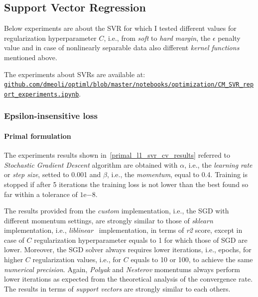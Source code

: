\subsection{Support Vector Regression}

Below experiments are about the SVR for which I tested different values for regularization hyperparameter $C$, i.e., from \emph{soft} to \emph{hard margin}, the $\epsilon$ penalty value and in case of nonlinearly separable data also different \emph{kernel functions} mentioned above.

The experiments about SVRs are available at: \\ \href{https://github.com/dmeoli/optiml/blob/master/notebooks/optimization/CM_SVR_report_experiments.ipynb}{\texttt{github.com/dmeoli/optiml/blob/master/notebooks/optimization/CM\_SVR\_report\_experiments.ipynb}}.

\subsubsection{Epsilon-insensitive loss}

\paragraph{Primal formulation}

The experiments results shown in~\ref{primal_l1_svr_cv_results} referred to \emph{Stochastic Gradient Descent} algorithm are obtained with $\alpha$, i.e., the \emph{learning rate} or \emph{step size}, setted to 0.001 and $\beta$, i.e., the \emph{momentum}, equal to 0.4. Training is stopped if after 5 iterations the training loss is not lower than the best found so far within a tolerance of $1\mathrm{e}{-8}$.



The results provided from the \emph{custom} implementation, i.e., the SGD with different momentum settings, are strongly similar to those of \emph{sklearn} implementation, i.e., \emph{liblinear}~\cite{fan2008liblinear} implementation, in terms of \emph{r2} score, except in case of $C$ regularization hyperparameter equals to 1 for which those of SGD are lower. Moreover, the SGD solver always requires lower iterations, i.e., epochs, for higher $C$ regularization values, i.e., for $C$ equals to 10 or 100, to achieve the same \emph{numerical precision}. Again, \emph{Polyak} and \emph{Nesterov} momentums always perform lower iterations as expected from the theoretical analysis of the convergence rate. The results in terms of \emph{support vectors} are strongly similar to each others.


